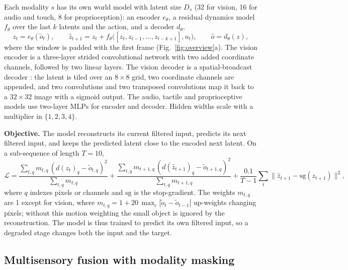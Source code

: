 \documentclass{article}
\theoremstyle{plain}
\theoremstyle{remark}
\begin{document}
Each modality \(s\) has its own world model with latent size \(D_s\) (32 for vision, 16 for audio and touch, 8 for proprioception): an encoder \(e_\theta\), a residual dynamics model \(f_\theta\) over the last \(k\) latents and the action, and a decoder \(d_\theta\),
\begin{equation}z_t=e_\theta(\tilde o_t),\qquad \hat z_{t+1}=z_t+f_\theta\big([z_t,z_{t-1},\dots,z_{t-k+1}],u_t\big),\qquad \hat o=d_\theta(z),\label{eq:wm}\end{equation}
where the window is padded with the first frame (Fig.~\ref{fig:overview}a). The vision encoder is a three-layer strided convolutional network with two added coordinate channels, followed by two linear layers. The vision decoder is a spatial-broadcast decoder \autocite{watters2019spatial}: the latent is tiled over an \(8\times8\) grid, two coordinate channels are appended, and two convolutions and two transposed convolutions map it back to a \(32\times32\) image with a sigmoid output. The audio, tactile and proprioceptive models use two-layer MLPs for encoder and decoder. Hidden widths scale with a multiplier in \(\{1,2,3,4\}\).

\textbf{Objective.} The model reconstructs its current filtered input, predicts its next filtered input, and keeps the predicted latent close to the encoded next latent. On a sub-sequence of length \(T=10\),
\begin{equation}\mathcal L=\frac{\sum_{t,q}m_{t,q}\,(d(z_t)_q-\tilde o_{t,q})^2}{\sum_{t,q}m_{t,q}}+\frac{\sum_{t,q}m_{t+1,q}\,(d(\hat z_{t+1})_q-\tilde o_{t+1,q})^2}{\sum_{t,q}m_{t+1,q}}+\frac{0.1}{T-1}\sum_t\lVert\hat z_{t+1}-\mathrm{sg}(z_{t+1})\rVert^2,\label{eq:loss}\end{equation}
where \(q\) indexes pixels or channels and \(\mathrm{sg}\) is the stop-gradient. The weights \(m_{t,q}\) are 1 except for vision, where \(m_{t,q}=1+20\,\max_c|\tilde o_t-\tilde o_{t-1}|\) up-weights changing pixels; without this motion weighting the small object is ignored by the reconstruction. The model is thus trained to predict its own filtered input, so a degraded stage changes both the input and the target.

\subsection{Multisensory fusion with modality masking}
\end{document}
